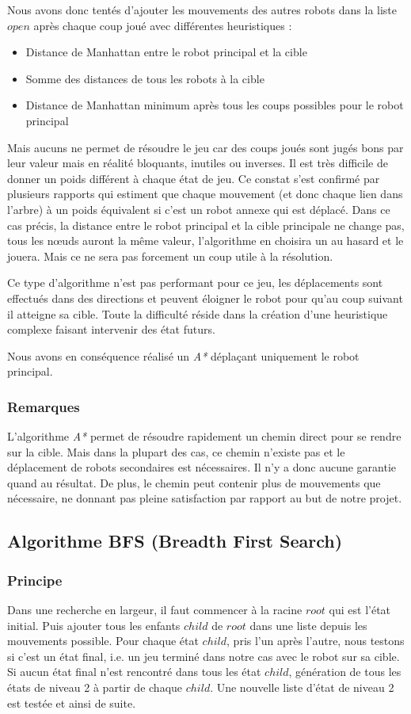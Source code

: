 \documentclass[a4paper]{article} %
\begin{document}
Nous avons donc tentés d'ajouter les mouvements des autres robots dans la liste $open$ après chaque coup joué avec différentes heuristiques : 
\begin{itemize}
\item Distance de Manhattan entre le robot principal et la cible
\item Somme des distances de tous les robots à la cible
\item Distance de Manhattan minimum après tous les coups possibles pour le robot principal
\end{itemize} 
Mais aucuns ne permet de résoudre le jeu car des coups joués sont jugés bons par leur valeur mais en réalité bloquants, inutiles ou inverses.
Il est très difficile de donner un poids différent à chaque état de jeu. Ce constat s'est confirmé par plusieurs rapports qui estiment que chaque mouvement (et donc chaque lien dans l'arbre) à un poids équivalent si c'est un robot annexe qui est déplacé.
Dans ce cas précis, la distance entre le robot principal et la cible principale ne change pas, tous les nœuds auront la même valeur, l'algorithme en choisira un au hasard et le jouera. Mais ce ne sera pas forcement un coup utile à la résolution.

Ce type d'algorithme n'est pas performant pour ce jeu, les déplacements sont effectués dans des directions et peuvent éloigner le robot pour qu'au coup suivant il atteigne sa cible. Toute la difficulté réside dans la création d'une heuristique complexe faisant intervenir des état futurs.

Nous avons en conséquence réalisé un \textsl{A*} déplaçant uniquement le robot principal.

		\subsubsection{Remarques}
L'algorithme \textsl{A*} permet de résoudre rapidement un chemin direct pour se rendre sur la cible. Mais dans la plupart des cas, ce chemin n'existe pas et le déplacement de robots secondaires est nécessaires. Il n'y a donc aucune garantie quand au résultat. De plus, le chemin peut contenir plus de mouvements que nécessaire, ne donnant pas pleine satisfaction par rapport au but de notre projet.

	\subsection{Algorithme BFS (Breadth First Search)}
		\subsubsection{Principe}	
Dans une recherche en largeur, il faut commencer à la racine $root$ qui est l'état initial. Puis ajouter tous les enfants $child$ de $root$ dans une liste depuis les mouvements possible. Pour chaque état $child$, pris l'un après l'autre, nous testons si c'est un état final, i.e. un jeu terminé dans notre cas avec le robot sur sa cible. Si aucun état final n'est rencontré dans tous les état $child$, génération de tous les états de niveau 2 à partir de chaque $child$. Une nouvelle liste d'état de niveau 2 est testée et ainsi de suite.
\end{document}

